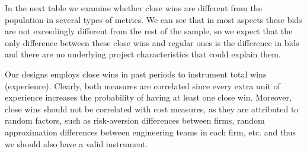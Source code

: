 In the next table we examine whether close wins are different from the population in several types of metrics. We can see that in most aspects these bids are not exceedingly different from the rest of the sample, so we expect that the only difference between these close wins and regular ones is the difference in bids and there are no underlying project characteristics that could explain them.

\begin{table}[!h]
\caption{Comparison of key statistics between close wins(<0.05\% difference between 1st and runner-up) and regular wins}
\centering
{}
\end{table}

Our designs employs close wins in past periods to instrument total wins (experience). Clearly, both measures are correlated since every extra unit of experience increases the probability of having at least one close win. Moreover, close wins should not be correlated with cost measures, as they are attributed to random factors, such as risk-aversion differences between firms, random approximation differences between engineering teams in each firm, etc. and thus we should also have a valid instrument.


